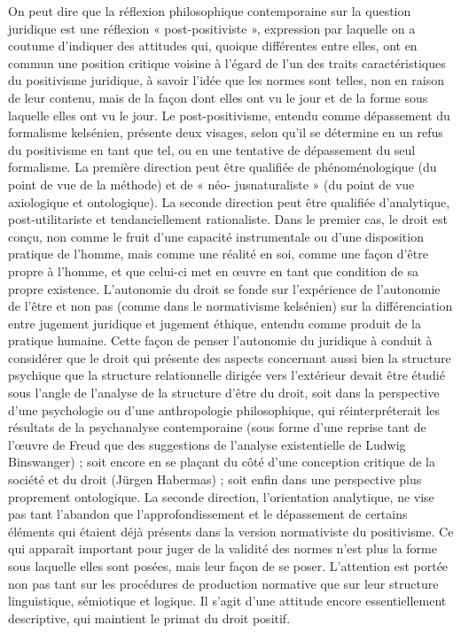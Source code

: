 On peut dire que la réflexion philosophique contemporaine sur la question
juridique est une réflexion « post-positiviste », expression par laquelle on a coutume d'indiquer des attitudes qui,
quoique différentes entre elles, ont en
commun une position critique voisine à
l'égard de l’un des traits caractéristiques
du positivisme juridique, à savoir l’idée
que les normes sont telles, non en raison
de leur contenu, mais de la façon dont
elles ont vu le jour et de la forme sous
laquelle elles ont vu le jour. Le post-positivisme, entendu comme dépassement du
formalisme  kelsénien, présente deux
visages, selon qu’il se détermine en un
refus du positivisme en tant que tel, ou
%
en une tentative de dépassement du seul
formalisme. La première direction peut
être qualifiée de phénoménologique (du
point de vue de la méthode) et de « néo-
jusnaturaliste » (du point de vue axiologique et ontologique). La seconde direction peut être qualifiée d’analytique,
post-utilitariste et tendanciellement rationaliste. Dans le premier cas, le droit est
conçu, non comme le fruit d’une capacité
instrumentale ou d’une disposition pratique de l’homme, mais comme une réalité en soi, comme une façon d’être propre
à l’homme, et que celui-ci met en œuvre
en tant que condition de sa propre existence. L’autonomie du droit se fonde sur
l'expérience de l’autonomie de l’être et
non pas (comme dans le normativisme
kelsénien) sur la différenciation entre
jugement juridique et jugement éthique,
entendu comme produit de la pratique
humaine. Cette façon de penser l’autonomie du juridique à conduit à considérer
que le droit qui présente des aspects
concernant aussi bien la structure psychique que la structure relationnelle dirigée vers l'extérieur devait être étudié sous
l'angle de l’analyse de la structure d’être
du droit, soit dans la perspective d’une
psychologie ou d’une anthropologie philosophique, qui réinterpréterait les résultats de la psychanalyse contemporaine
(sous forme d’une reprise tant de l’œuvre
de Freud que des suggestions de l'analyse
existentielle de Ludwig Binswanger) ; soit
encore en se plaçant du côté d’une
conception critique de la société et du
droit (Jürgen Habermas) ; soit enfin dans
une perspective plus proprement ontologique. La seconde direction, l'orientation
analytique, ne vise pas tant l’abandon que
l’approfondissement et le dépassement de
certains éléments qui étaient déjà présents dans la version normativiste du positivisme. Ce qui apparaît important pour
juger de la validité des normes n’est plus
la forme sous laquelle elles sont posées,
mais leur façon de se poser. L’attention
est portée non pas tant sur les procédures
de production normative que sur leur
structure linguistique, sémiotique et
logique. Il s’agit d’une attitude encore
essentiellement descriptive, qui maintient
le primat du droit positif.

